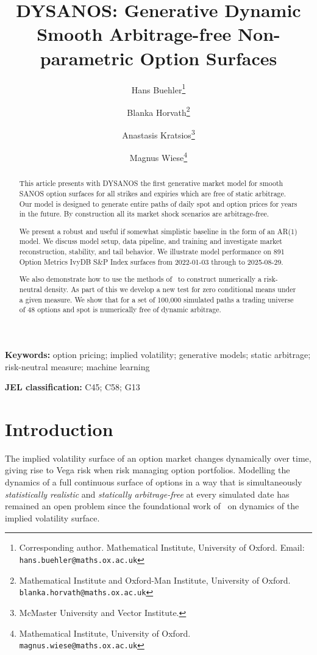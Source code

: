 \documentclass[11pt,a4paper]{article}
\title{DYSANOS: Generative Dynamic Smooth Arbitrage-free Non-parametric
Option Surfaces}
\author{%
  Hans Buehler\thanks{%
    Corresponding author. Mathematical Institute,
    University of Oxford. Email: \texttt{hans.buehler@maths.ox.ac.uk}}
  \and
  Blanka Horvath\thanks{%
    Mathematical Institute and Oxford-Man Institute,
    University of Oxford. \texttt{blanka.horvath@maths.ox.ac.uk}}
  \and
  Anastasis Kratsios\thanks{%
    McMaster University and Vector Institute.}
    \and
  Magnus Wiese\thanks{%
    Mathematical Institute,
    University of Oxford. \texttt{magnus.wiese@maths.ox.ac.uk}}
}
\date{}
\begin{document}
\maketitle


\begin{abstract}
This article presents with DYSANOS the first generative market model 
for smooth SANOS option surfaces for all strikes and expiries which are
free of static arbitrage. 
Our model is designed to generate entire paths of daily spot and option prices for years
in the future. By construction all its market shock scenarios are arbitrage-free.

We present a robust and useful if somewhat simplistic baseline in the form of an AR(1) model.
We discuss model setup, data pipeline, and training and investigate market
reconstruction, stability, and tail behavior. We illustrate model performance
on 891 Option Metrics IvyDB S\&P Index surfaces from 2022-01-03 through to
2025-08-29.

We also demonstrate how to use the methods of~\citet{removedrift} to construct
numerically a risk-neutral density. As part of this we develop a new test for zero conditional means under a given measure.
We show that for a set of 100,000 simulated paths
a trading universe of 48 options and spot is numerically free of dynamic arbitrage.
\end{abstract}

\noindent\textbf{Keywords:} option pricing; implied volatility; generative
models; static arbitrage; risk-neutral measure; machine learning

\medskip
\noindent\textbf{JEL classification:} C45; C58; G13

\bigskip


\section{Introduction}
\label{sec:intro}

The implied volatility surface of an option market changes dynamically over time, giving rise to
Vega risk when risk managing option portfolios.
Modelling the dynamics of a full continuous surface of options
in a way that is simultaneously \emph{statistically realistic} and \emph{statically
arbitrage-free} at every simulated date has remained an open problem since the
foundational work of~\citet{ContVol} on dynamics of the implied volatility surface.
\end{document}
